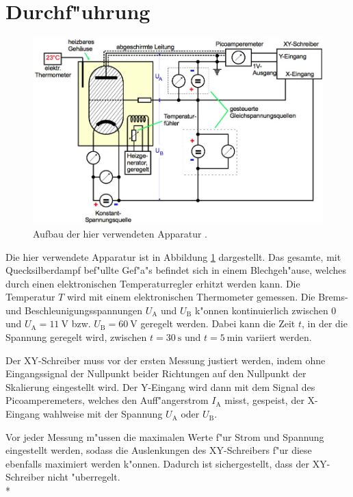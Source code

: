 \section{Durchf"uhrung}
\label{sec:durchfuehrung}
	\begin{figure}[h]
		\centering
		\includegraphics[width = 12cm]{img/aufbau-exakt.jpeg}
		\caption{Aufbau der hier verwendeten Apparatur \cite{anleitung}. \label{fig:aufbau-exakt}}
	\end{figure}

	Die hier verwendete Apparatur ist in Abbildung \ref{fig:aufbau-exakt} dargestellt.
	Das gesamte, mit Quecksilberdampf bef"ullte Gef"a"s befindet sich in einem Blechgeh"ause, welches durch einen elektronischen Temperaturregler erhitzt werden kann.
	Die Temperatur $T$ wird mit einem elektronischen Thermometer gemessen.
	Die Brems- und Beschleunigungsspannungen $U_\mathrm{A}$ und $U_\mathrm{B}$ k"onnen kontinuierlich zwischen 0 und $U_\mathrm{A} = \SI{11}{\volt}$ bzw. $U_\mathrm{B} = \SI{60}{\volt}$ geregelt werden.
	Dabei kann die Zeit $t$, in der die Spannung geregelt wird, zwischen $t = \SI{30}{\second}$ und $t = \SI{5}{\minute}$ variiert werden.

	Der XY-Schreiber muss vor der ersten Messung justiert werden, indem ohne Eingangssignal der Nullpunkt beider Richtungen auf den Nullpunkt der Skalierung eingestellt wird.
	Der Y-Eingang wird dann mit dem Signal des Picoamperemeters, welches den Auff"angerstrom $I_\mathrm{A}$ misst, gespeist, 
	der X-Eingang wahlweise mit der Spannung $U_\mathrm{A}$ oder $U_\mathrm{B}$.

	Vor jeder Messung m"ussen die maximalen Werte f"ur Strom und Spannung eingestellt werden, sodass die Auslenkungen des XY-Schreibers f"ur diese ebenfalls maximiert werden k"onnen.
	Dadurch ist sichergestellt, dass der XY-Schreiber nicht "uberregelt.
	\\*

